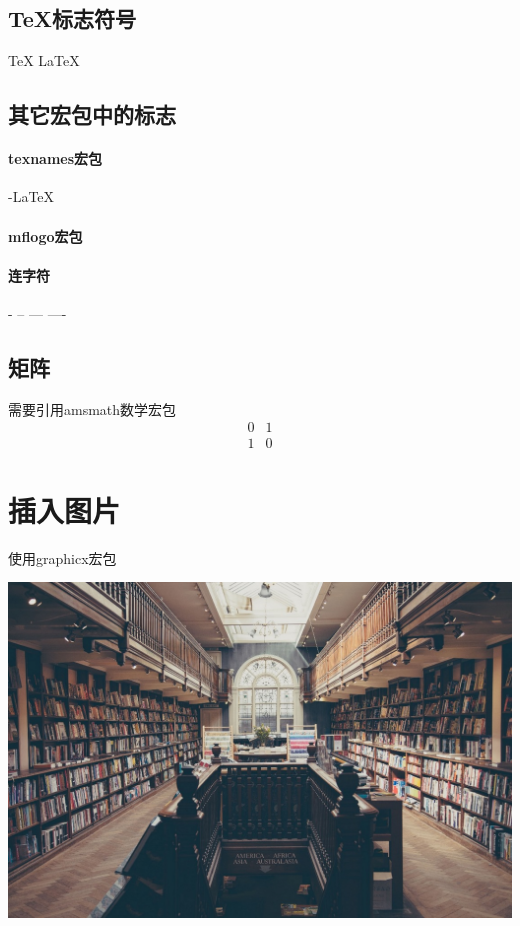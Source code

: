 \documentclass[UTF8]{article}  %
\begin{document}
\subsection{\TeX 标志符号}
\TeX{} \LaTeX{} \LaTeXe{}
\XeLaTeX
\subsection{其它宏包中的标志}
\paragraph{texnames宏包}
\AmSTeX{} \AmS-\LaTeX{} \BibTeX{} \LuaTeX{}
\paragraph{mflogo宏包}
\METAFONT{} \MF{} \MP{}

\paragraph{连字符}
- -- --- ----
\subsection{矩阵}
需要引用amsmath数学宏包\\
\[
\begin{matrix}
0 & 1 \\
1 & 0 
\end{matrix}
\]
\section{插入图片}
使用graphicx宏包

\includegraphics[scale=0.1]{library.jpg}
\end{document}
